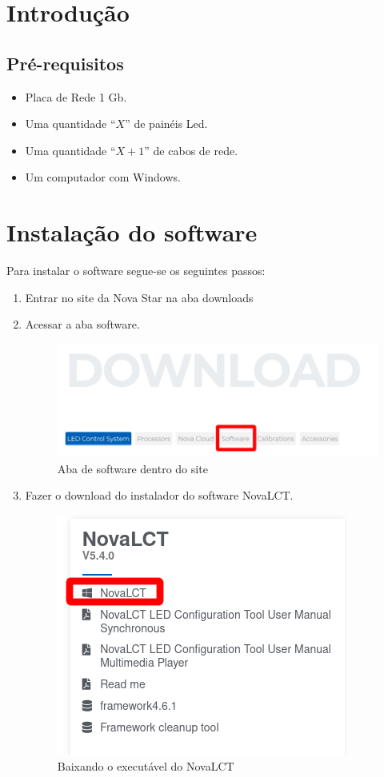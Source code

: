 \documentclass[12pt, a4paper]{article}
\begin{document}
	\section{Introdução}\label{Introdução}
	\subsection{Pré-requisitos}\label{Pré-requisitos}
	\begin{itemize}
		\item Placa de Rede 1 Gb.
		\item Uma quantidade ``$X$'' de painéis Led.
		\item Uma quantidade ``$X+1$'' de cabos de rede.
		\item Um computador com Windows.
	\end{itemize}

	\section{Instalação do software}\label{Instalação do software}
	Para instalar o software segue-se os seguintes passos:
	\begin{enumerate}
		\item Entrar no site da Nova Star na aba downloads\cite{siteDownload}
		\item Acessar a aba software.
		\begin{figure}[!htb]
			\centering
			\includegraphics[width=\textwidth]{Download.png}
			\caption{\label{fig:Download}Aba de software dentro do site\cite{siteDownload}}
		\end{figure}
		\item Fazer o download do instalador do software NovaLCT.
		\begin{figure}[!htb]
			\centering
			\includegraphics[scale=.9]{NOVALCT_INSTALL.png}
			\caption{\label{fig:NOVALCT_INSTALL}Baixando o executável do NovaLCT}
		\end{figure}
	\end{enumerate}
\end{document}
